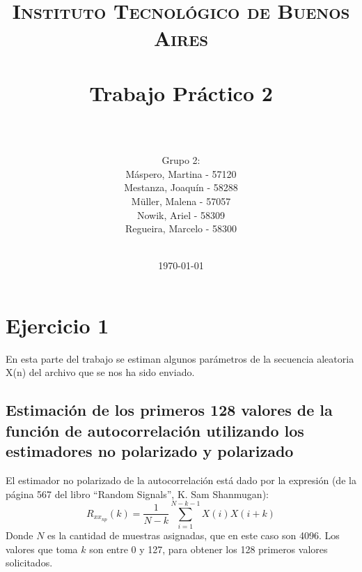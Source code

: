 
\usepackage[utf8]{inputenc}





\title{
	\normalfont \normalsize \textsc{Instituto Tecnológico de Buenos Aires} \\ [25pt]
	\horrule{2pt} \\[0.4cm]
	\huge Trabajo Pr\'actico 2\\
	\horrule{2pt} \\[0cm]
\author{Grupo 2:\\M\'aspero, Martina - 57120\\Mestanza, Joaqu\'in - 58288\\ Müller, Malena - 57057\\Nowik, Ariel - 58309\\Regueira, Marcelo - 58300\\ \\ }
}
\date{\today} 

\maketitle
\newpage

\section*{Ejercicio 1}

En esta parte del trabajo se estiman algunos par\'ametros de la secuencia aleatoria X(n) del archivo que se nos ha sido enviado.

\subsection{Estimaci\'on de los primeros 128 valores de la funci\'on de autocorrelaci\'on utilizando los estimadores no polarizado y polarizado}

El estimador no polarizado de la autocorrelación está dado por la expresión (de la página 567 del libro ``Random Signals'', K. Sam Shanmugan):
$$R_{xx_{np}}(k) = \frac{1}{N - k} \sum_{i=1}^{N-k-1}X(i)X(i+k)$$
Donde $N$ es la cantidad de muestras asignadas, que en este caso son 4096. Los valores que toma $k$ son entre 0 y 127, para obtener los 128 primeros valores solicitados.\par

